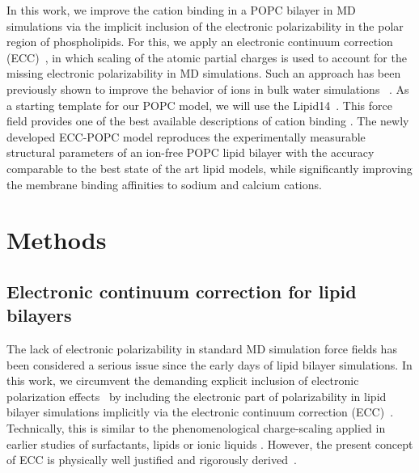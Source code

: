\documentclass[aip,jcp,twocolumn]{revtex4}
\begin{document}
In this work, we improve the cation binding in a POPC bilayer in MD simulations 
via the implicit inclusion of the electronic polarizability in the polar region of phospholipids. 
For this, we apply an electronic continuum correction (ECC)~\cite{leontyev11}, 
in which scaling of the atomic partial charges is used to account for the missing electronic polarizability in MD simulations. 
Such an approach has been previously shown to improve the behavior of ions in bulk water simulations ~\cite{martinek17, Pluharova2014, kohagen14, kohagen16}. As a starting template for our POPC model, we will use the Lipid14~\cite{dickson14}. This force field provides one of the best available descriptions of cation binding \cite{catte16}. 
The newly developed ECC-POPC model reproduces the experimentally
measurable structural parameters of an ion-free POPC lipid bilayer with the accuracy comparable to the best state of the art lipid models, while significantly improving the membrane binding affinities to sodium and calcium cations.

\section{Methods}

\subsection{Electronic continuum correction for lipid bilayers}\label{section:ecc}
The lack of electronic polarizability in standard MD simulation force fields has been considered a serious issue since the early days of lipid bilayer simulations. In this work, we circumvent the demanding explicit inclusion of electronic polarization effects~\cite{lucas12, chowdhary13} by including the electronic part of polarizability in lipid bilayer simulations implicitly via the electronic continuum correction (ECC)~\cite{leontyev11}. Technically, this is similar to the phenomenological charge-scaling applied in earlier studies of surfactants, lipids or ionic liquids \cite{jonsson86, egberts94, beichel14}. However, the present concept of ECC is physically well justified and rigorously derived~\cite{leontyev09, leontyev10, leontyev11, leontyev14}.
\end{document}
